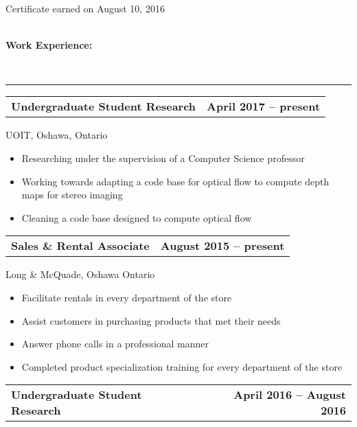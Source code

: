 \documentclass[]{article}
\begin{document}
%
Certificate earned on August 10, 2016
\\
\\
\begin{large} \textbf{Work Experience:} \end{large}\\
\rule[1.2ex]{\linewidth}{0.4pt}
\begin{tabu} to 
\textbf{Undergraduate Student Research}& 
\textbf {April 2017 -- present}
\end{tabu}
%
UOIT, Oshawa, Ontario
%
\begin{itemize}
\item
  Researching under the supervision of a Computer Science professor
\item
  Working towards adapting a code base for optical flow to compute
  depth maps for stereo imaging
\item
  Cleaning a code base designed to compute optical flow
\end{itemize}
%
\begin{tabu} to 
  \textbf{Sales \& Rental Associate} &
  \textbf{August 2015 -- present}
\end{tabu}
%
Long \& McQuade, Oshawa Ontario
%
\begin{itemize}
\item
  Facilitate rentals in every department of the store
\item
  Assist customers in purchasing products that met their needs
\item
  Answer phone calls in a professional manner
\item
  Completed product specialization training for every department of
  the store
\end{itemize}
%
\begin{tabu} to 
  \textbf{Undergraduate Student Research} &
  \textbf{April 2016 -- August 2016}
\end{tabu}
\end{document}
